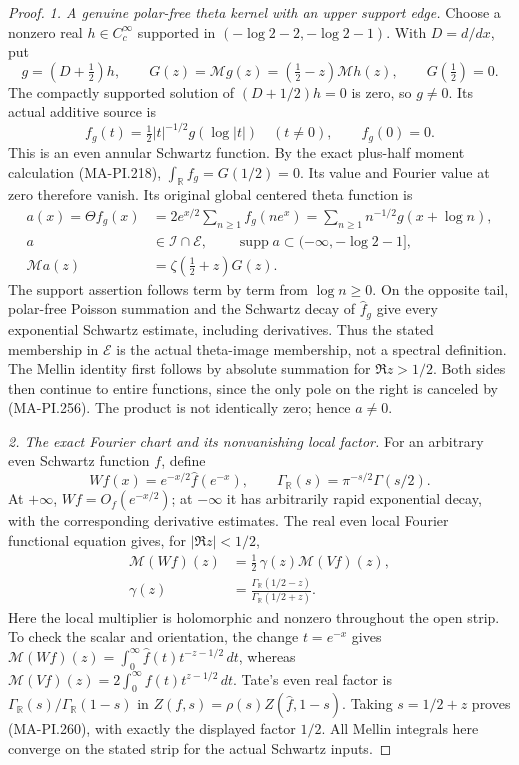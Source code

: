 \begin{proof}
\emph{1. A genuine polar-free theta kernel with an upper support edge.}
Choose a nonzero real \(h\in C_c^\infty\) supported in
\((-\log2-2,-\log2-1)\).  With \(D=d/dx\), put
\[
 g=(D+\tfrac12)h,\qquad
 G(z)=\mathcal Mg(z)=(\tfrac12-z)\mathcal Mh(z),
 \qquad G(\tfrac12)=0.
 \tag{MA-PI.256}
\]
The compactly supported solution of \((D+1/2)h=0\) is
zero, so \(g\ne0\).  Its actual additive source is
\[
 f_g(t)=\tfrac12|t|^{-1/2}g(\log|t|)\quad(t\ne0),
 \qquad f_g(0)=0.
 \tag{MA-PI.257}
\]
This is an even annular Schwartz function.  By the exact
plus-half moment calculation (MA-PI.218),
\(\int_{\mathbb R}f_g=G(1/2)=0\).  Its value and Fourier
value at zero therefore vanish.  Its original global
centered theta function is
\[
 \begin{aligned}
 a(x)=\Theta f_g(x)
   &=2e^{x/2}\sum_{n\ge1}f_g(ne^x)
     =\sum_{n\ge1}n^{-1/2}g(x+\log n),\\
 a&\in\mathscr I\cap\mathcal E,\qquad
 \operatorname{supp}a\subset(-\infty,-\log2-1],\\
 \mathcal Ma(z)&=\zeta(\tfrac12+z)G(z).
 \end{aligned}
 \tag{MA-PI.258}
\]
The support assertion follows term by term from \(\log n\ge0\).
On the opposite tail, polar-free Poisson summation and the
Schwartz decay of \(\widehat f_g\) give every exponential
Schwartz estimate, including derivatives.  Thus the stated
membership in \(\mathcal E\) is the actual theta-image
membership, not a spectral definition.  The Mellin identity
first follows by absolute summation for \(\Re z>1/2\).
Both sides then continue to entire functions, since the
only pole on the right is canceled by (MA-PI.256).
The product is not identically zero; hence \(a\ne0\).

\emph{2. The exact Fourier chart and its nonvanishing local factor.}
For an arbitrary even Schwartz function \(f\), define
\[
       Wf(x)=e^{-x/2}\widehat f(e^{-x}),\qquad
       \Gamma_{\mathbb R}(s)=\pi^{-s/2}\Gamma(s/2).
 \tag{MA-PI.259}
\]
At \(+\infty\), \(Wf=O_f(e^{-x/2})\); at \(-\infty\)
it has arbitrarily rapid exponential decay, with the
corresponding derivative estimates.  The real even local
Fourier functional equation gives, for \(|\Re z|<1/2\),
\[
 \begin{aligned}
 \mathcal M(Wf)(z)
   &=\frac12\,\gamma(z)\mathcal M(Vf)(z),\\
 \gamma(z)&=
       \frac{\Gamma_{\mathbb R}(1/2-z)}
            {\Gamma_{\mathbb R}(1/2+z)}.
 \end{aligned}
 \tag{MA-PI.260}
\]
Here the local multiplier is holomorphic and nonzero
throughout the open strip.  To check the scalar and
orientation, the change \(t=e^{-x}\) gives
\(\mathcal M(Wf)(z)=\int_0^\infty\widehat f(t)t^{-z-1/2}\,dt\),
whereas \(\mathcal M(Vf)(z)=2\int_0^\infty f(t)t^{z-1/2}\,dt\).
Tate's even real factor is
\(\Gamma_{\mathbb R}(s)/\Gamma_{\mathbb R}(1-s)\)
in \(Z(f,s)=\rho(s)Z(\widehat f,1-s)\).
Taking \(s=1/2+z\) proves (MA-PI.260), with exactly
the displayed factor \(1/2\).  All Mellin integrals here
converge on the stated strip for the actual Schwartz inputs.


\end{proof}
